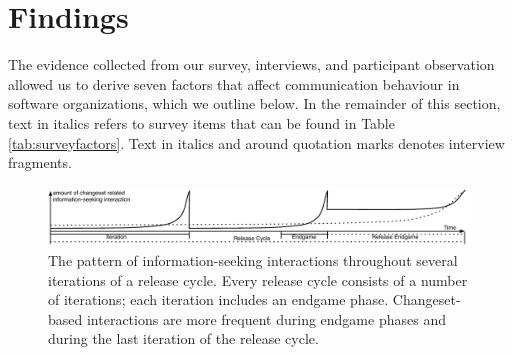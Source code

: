 \section{Findings}
\label{sec:findings}

The evidence collected from our survey, interviews, and participant observation allowed us to derive seven factors that affect communication behaviour in software organizations, which we outline below. In the remainder of this section, text in italics refers to survey items that can be found in Table \ref{tab:surveyfactors}. Text in italics and around quotation marks denotes interview fragments.

\begin{figure}[tb]
\centering
\includegraphics[width=\textwidth]{figures/findingProcess2}
\vspace{-20pt}\caption{The pattern of information-seeking interactions throughout several iterations of a release cycle. Every release cycle consists of a number of iterations; each iteration includes an endgame phase. Changeset-based interactions are more frequent during endgame phases and during the last iteration of the release cycle.}
\label{IterationsFig}
\end{figure}



